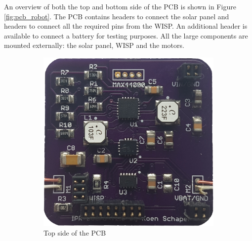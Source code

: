 An overview of both the top and bottom side of the PCB is shown in Figure \ref{fig:pcb_robot}.
The PCB contains headers to connect the solar panel and headers to connect all the required pins from the WISP.
An additional header is available to connect a battery for testing purposes.
All the large components are mounted externally: the solar panel, WISP and the motors.


\begin{figure}[h!]
	\centering
	\begin{subfigure}[b]{0.45\textwidth}
		\includegraphics[width=\textwidth]{pics/pcb_front.jpg}
		\caption{Top side of the PCB}
		\label{fig:pcb_robot_front}
	\end{subfigure}
	\qquad
	\begin{subfigure}[b]{0.45\textwidth}

\end{subfigure}
\end{figure}
